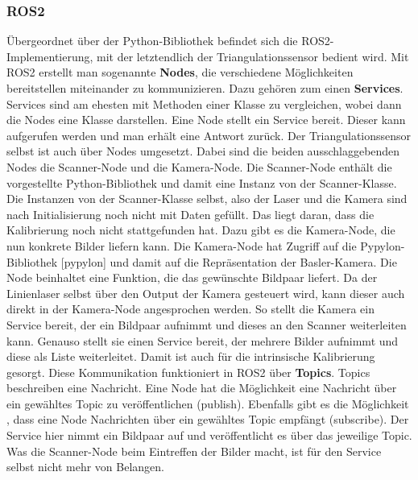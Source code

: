 		\subsubsection{ROS2}
		
		Übergeordnet über der Python-Bibliothek befindet sich die ROS2-Implementierung, mit der letztendlich der Triangulationssensor bedient wird. Mit ROS2 erstellt man sogenannte \textbf{Nodes}, die verschiedene Möglichkeiten bereitstellen miteinander zu kommunizieren. Dazu gehören zum einen \textbf{Services}. Services sind am ehesten mit Methoden einer Klasse zu vergleichen, wobei dann die Nodes eine Klasse darstellen. Eine Node stellt ein Service bereit. Dieser kann aufgerufen werden und man erhält eine Antwort zurück. Der Triangulationssensor selbst ist auch über Nodes umgesetzt. Dabei sind die beiden ausschlaggebenden Nodes die Scanner-Node und die Kamera-Node. Die Scanner-Node enthält die vorgestellte Python-Bibliothek und damit eine Instanz von der Scanner-Klasse. Die Instanzen von der Scanner-Klasse selbst, also der Laser und die Kamera sind nach Initialisierung noch nicht mit Daten gefüllt. Das liegt daran, dass die Kalibrierung noch nicht stattgefunden hat. Dazu gibt es die Kamera-Node, die nun konkrete Bilder liefern kann. Die Kamera-Node hat Zugriff auf die Pypylon-Bibliothek [pypylon] und damit auf die Repräsentation der Basler-Kamera. Die Node beinhaltet eine Funktion, die das gewünschte Bildpaar liefert. Da der Linienlaser selbst über den Output der Kamera gesteuert wird, kann dieser auch direkt in der Kamera-Node angesprochen werden. So stellt die Kamera ein Service bereit, der ein Bildpaar aufnimmt und dieses an den Scanner weiterleiten kann. Genauso stellt sie einen Service bereit, der mehrere Bilder aufnimmt und diese als Liste weiterleitet. Damit ist auch für die intrinsische Kalibrierung gesorgt. \newline
		Diese Kommunikation funktioniert in ROS2 über \textbf{Topics}. Topics beschreiben eine Nachricht. Eine Node hat die Möglichkeit eine Nachricht über ein gewähltes Topic zu veröffentlichen (publish). Ebenfalls gibt es die Möglichkeit , dass eine Node Nachrichten über ein gewähltes Topic empfängt (subscribe). Der Service hier nimmt ein Bildpaar auf und veröffentlicht es über das jeweilige Topic. Was die Scanner-Node beim Eintreffen der Bilder macht, ist für den Service selbst nicht mehr von Belangen.\newline
